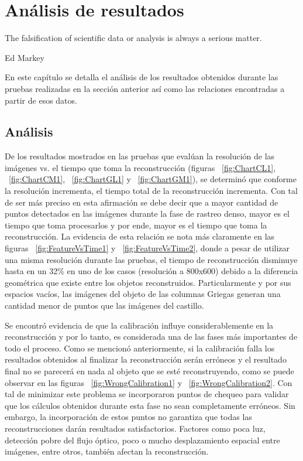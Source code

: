\chapter{An\'{a}lisis de resultados}
\label{chap:analisis}
\epigraph{The falsification of scientific data or analysis is always a serious matter.}{Ed Markey}

En este cap\'{i}tulo se detalla el an\'{a}lisis de los resultados obtenidos durante las pruebas realizadas en la secci\'{o}n anterior as\'{i} como las relaciones encontradas a partir de esos datos.

\section{An\'{a}lisis}
De los resultados mostrados en las pruebas que eval\'{u}an la resoluci\'{o}n de las im\'{a}genes vs. el tiempo que toma la reconstrucci\'{o}n (figuras  ~\ref{fig:ChartCL1}, ~\ref{fig:ChartCM1}, ~\ref{fig:ChartGL1} y ~\ref{fig:ChartGM1}), se determin\'{o} que conforme la resoluci\'{o}n incrementa, el tiempo total de la reconstrucci\'{o}n incrementa. Con tal de ser m\'{a}s preciso en esta afirmaci\'{o}n se debe decir que a mayor cantidad de puntos detectados en las im\'{a}genes durante la fase de rastreo denso, mayor es el tiempo que toma procesarlos y por ende, mayor es el tiempo que toma la reconstrucci\'{o}n. La evidencia de esta relaci\'{o}n se nota m\'{a}s claramente en las figuras ~\ref{fig:FeatureVsTime1} y ~\ref{fig:FeatureVsTime2}, donde a pesar de utilizar una misma resoluci\'{o}n durante las pruebas, el tiempo de reconstrucci\'{o}n disminuye hasta en un 32\% en uno de los casos (resoluci\'{o}n a 800x600) debido a la diferencia geom\'{e}trica que existe entre los objetos reconstruidos. Particularmente y por sus espacios vac\'{i}os, las im\'{a}genes del objeto de las columnas Griegas generan una cantidad menor de puntos que las im\'{a}genes del castillo.

Se encontr\'{o} evidencia de que la calibraci\'{o}n influye considerablemente en la reconstrucci\'{o}n y por lo tanto, es considerada una de las fases m\'{a}s importantes de todo el proceso. Como se mencion\'{o} anteriormente, si la calibraci\'{o}n falla los resultados obtenidos al finalizar la reconstrucci\'{o}n ser\'{a}n err\'{o}neos y el resultado final no se parecer\'{a} en nada al objeto que se est\'{e} reconstruyendo, como se puede observar en las figuras ~\ref{fig:WrongCalibration1} y ~\ref{fig:WrongCalibration2}. Con tal de minimizar este problema se incorporaron puntos de chequeo para validar que los c\'{a}lculos obtenidos durante esta fase no sean completamente err\'{o}neos. Sin embargo, la incorporaci\'{o}n de estos puntos no garantiza que todas las reconstrucciones dar\'{a}n resultados satisfactorios. Factores como poca luz, detecci\'{o}n pobre del flujo \'{o}ptico, poco o mucho desplazamiento espacial entre im\'{a}genes, entre otros, tambi\'{e}n afectan la reconstrucci\'{o}n.

